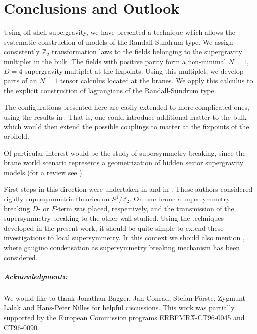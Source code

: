 \documentclass[a4paper,12pt, twoside]{article}
\numberwithin{equation}{section}
\begin{document}
\section{Conclusions and Outlook}\label{conc}
Using off-shell supergravity, we have presented a technique which 
allows the systematic construction of models of the Randall-Sundrum type. We 
assign consistently $\mathbb{Z}_2$ transformation laws to the fields 
belonging to the supergravity multiplet in the bulk. The fields with 
positive parity form a non-minimal $N=1$, $D=4$ supergravity multiplet at 
the fixpoints. Using this multiplet, we develop parts of an $N=1$ tensor 
calculus located at the branes. We apply this calculus to the explicit 
construction of lagrangians of the Randall-Sundrum type. 

The configurations presented here are easily extended to more 
complicated ones, using the results in \cite{Zucker:2000ej, Zucker:1999fn, 
diss}. That is, one could introduce additional matter to the bulk which 
would then extend the possible couplings to matter at the fixpoints of the 
orbifold.

Of particular interest would be the study of supersymmetry breaking, 
since the brane world scenario represents a geometrization of hidden 
sector supergravity models (for a review see \cite{Nilles:1984ge}). 

First steps in this direction were undertaken in 
\cite{Mirabelli:1998aj} and in \cite{gabi}. These authors considered rigidly supersymmetric 
theories on $S^1/\mathbb{Z}_2$. On one brane a supersymmetry breaking 
$D$- or $F$-term was placed, respectively, and the transmission of the 
supersymmetry breaking to the other wall studied. Using the techniques 
developed in the present work, it should be quite simple to extend these 
investigations to local supersymmetry. In this context we should also 
mention \cite{Falkowski:2000er}, where gaugino condensation as 
supersymmetry breaking mechanism has been considered.


\subparagraph{Acknowledgments:}
We would like to thank Jonathan Bagger, Jan Conrad, Stefan F\"orste, 
Zygmunt Lalak and Hans-Peter Nilles for helpful discussions.
This work was partially supported by the European Commission programs 
ERBFMRX-CT96-0045 and CT96-0090.
\end{document}
